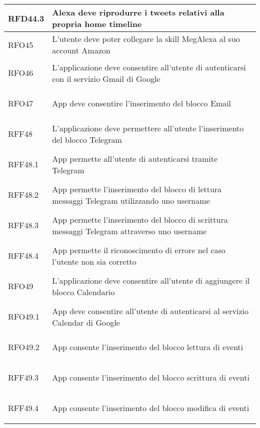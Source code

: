 \begin{longtable}{|>{\centering}m{5em}|m{25em}|}
	\hypertarget{RFD44.3}{RFD44.3} & Alexa deve riprodurre i tweets relativi alla propria home timeline\\ \hline
	
	\hypertarget{RFO45}{RFO45} & L'utente deve poter collegare la skill MegAlexa al suo account Amazon\\ \hline
	
	\hypertarget{RFO46}{RFO46} & L'applicazione deve consentire all'utente di autenticarsi con il servizio Gmail di Google\\ \hline
	
	\hypertarget{RFO47}{RFO47} & App deve consentire l'inserimento del blocco Email\\ \hline
	
	\hypertarget{RFF48}{RFF48} & L'applicazione deve permettere all'utente l'inserimento del blocco Telegram\\ \hline
	
	\hypertarget{RFF48.1}{RFF48.1} & App permette all'utente di autenticarsi tramite Telegram\\ \hline
	
	\hypertarget{RFF48.2}{RFF48.2} & App permette l'inserimento del blocco di lettura messaggi Telegram utilizzando uno username\\ \hline
	
	\hypertarget{RFF48.3}{RFF48.3} & App permette l'inserimento del blocco di scrittura messaggi Telegram attraverso uno username\\ \hline
	
	\hypertarget{RFF48.4}{RFF48.4} & App permette il riconoscimento di errore nel caso l'utente non sia corretto\\ \hline
	
	\hypertarget{RFO49}{RFO49} & L'applicazione deve consentire all'utente di aggiungere il blocco Calendario\\ \hline
	
	\hypertarget{RFO49.1}{RFO49.1} & App deve consentire all'utente di autenticarsi al servizio Calendar di Google\\ \hline
	
	\hypertarget{RFO49.2}{RFO49.2} & App consente l'inserimento del blocco lettura di eventi \\ \hline
	
	\hypertarget{RFF49.3}{RFF49.3} & App consente l'inserimento del blocco scrittura di eventi\\ \hline
	
	\hypertarget{RFF49.4}{RFF49.4} & App consente l'inserimento del blocco modifica di eventi\\ \hline
	

\end{longtable}
